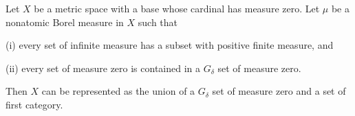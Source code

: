 Let $X$ be a metric space with a base whose cardinal has measure zero. Let $\mu$ be a nonatomic Borel measure in $X$ such that

(i) every set of infinite measure has a subset with positive finite measure, and

(ii) every set of measure zero is contained in a $G_\delta$ set of measure zero.

Then $X$ can be represented as the union of a $G_\delta$ set of measure zero and a set of first category.
